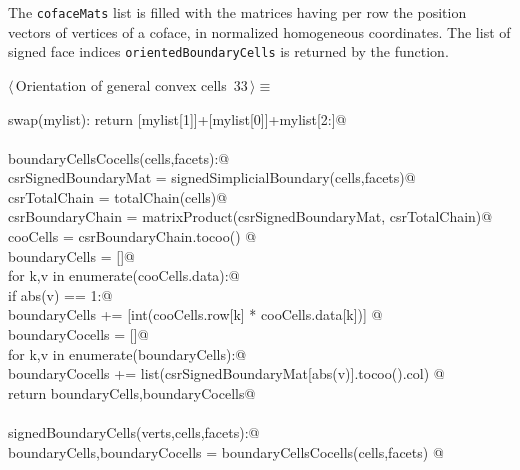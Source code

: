\documentclass[11pt,oneside]{article}    %
\begin{document}
The \texttt{cofaceMats} list is filled 
with the matrices having per row the position vectors of vertices of a coface, in normalized 
homogeneous coordinates. The list of signed face indices \texttt{orientedBoundaryCells} is returned by the function.

\begin{flushleft} \small \label{scrap53}
\protect{}$\langle\,$Orientation of general convex cells\nobreak\ {\footnotesize 33}$\,\rangle\equiv$
\vspace{-1ex}
\begin{list}{}{} \item
\mbox{}\verb@def swap(mylist): return [mylist[1]]+[mylist[0]]+mylist[2:]@\\
\mbox{}\verb@@\\
\mbox{}\verb@def boundaryCellsCocells(cells,facets):@\\
\mbox{}\verb@    csrSignedBoundaryMat = signedSimplicialBoundary(cells,facets)@\\
\mbox{}\verb@    csrTotalChain = totalChain(cells)@\\
\mbox{}\verb@    csrBoundaryChain = matrixProduct(csrSignedBoundaryMat, csrTotalChain)@\\
\mbox{}\verb@    cooCells = csrBoundaryChain.tocoo()    @\\
\mbox{}\verb@    boundaryCells = []@\\
\mbox{}\verb@    for k,v in enumerate(cooCells.data):@\\
\mbox{}\verb@        if abs(v) == 1:@\\
\mbox{}\verb@            boundaryCells += [int(cooCells.row[k] * cooCells.data[k])]            @\\
\mbox{}\verb@    boundaryCocells = []@\\
\mbox{}\verb@    for k,v in enumerate(boundaryCells):@\\
\mbox{}\verb@        boundaryCocells += list(csrSignedBoundaryMat[abs(v)].tocoo().col)        @\\
\mbox{}\verb@    return boundaryCells,boundaryCocells@\\
\mbox{}\verb@@\\
\mbox{}\verb@def signedBoundaryCells(verts,cells,facets):@\\
\mbox{}\verb@    boundaryCells,boundaryCocells = boundaryCellsCocells(cells,facets)        @\\

\end{list}
\end{flushleft}
\end{document}
